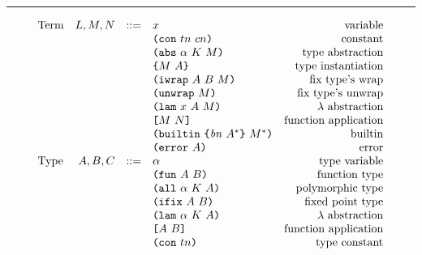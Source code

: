 \documentclass[../plutus-core-specification.tex]{subfiles}
\begin{document}
\medskip\hrule\medskip

\begin{minipage}{\linewidth}
    \centering
    \[\begin{array}{lrclr}
        \textrm{Term}             & L,M,N  & ::= & x                          & \textrm{variable}\\
                                  &        &     & \texttt{(} \texttt{con} ~ tn ~ cn \texttt{)}               & \textrm{constant}\\
                                  &        &     & \texttt{(} \texttt{abs} ~ \alpha ~ K ~ M \texttt{)}         & \textrm{type abstraction}\\
                                  &        &     & \texttt{\{}M ~ A\texttt{\}}                & \textrm{type instantiation}\\
                                  &        &     & \texttt{(} \texttt{iwrap} ~ A ~ B ~ M \texttt{)}            & \textrm{fix type's wrap}\\
                                  &        &     & \texttt{(} \texttt{unwrap} ~ M \texttt{)}                 & \textrm{fix type's unwrap}\\
                                  &        &     & \texttt{(} \texttt{lam} ~ x ~ A ~ M \texttt{)}              & \textrm{$\lambda$ abstraction}\\
                                  &        &     & \texttt{[} M ~ N \texttt{]}                 & \textrm{function application}\\
                                  &        &     & \texttt{(} \texttt{builtin} ~ \texttt{\{} \mathit{bn} ~ A^* \texttt{\}} ~ M^* \texttt{)}     & \textrm{builtin}\\
                                  &        &     & \texttt{(} \texttt{error} ~ A \texttt{)}                  & \textrm{error}\\
        \textrm{Type}             & A,B,C  & ::= & \alpha                     & \textrm{type variable}\\
                                  &        &     & \texttt{(} \texttt{fun} ~ A ~ B \texttt{)}                & \textrm{function type}\\
                                  &        &     & \texttt{(} \texttt{all} ~ \alpha ~ K ~ A \texttt{)}        & \textrm{polymorphic type}\\
                                  &        &     & \texttt{(} \texttt{ifix} ~ A ~ B \texttt{)}                & \textrm{fixed point type}\\
                                  &        &     & \texttt{(} \texttt{lam} ~ \alpha ~ K ~ A \texttt{)}        & \textrm{$\lambda$ abstraction}\\
                                  &        &     & \texttt{[} A ~ B \texttt{]}                & \textrm{function application}\\
                                  &        &     & \texttt{(} \texttt{con} ~ tn \texttt{)}                  & \textrm{type constant}\\

\end{array}\]
\end{minipage}
\end{document}
